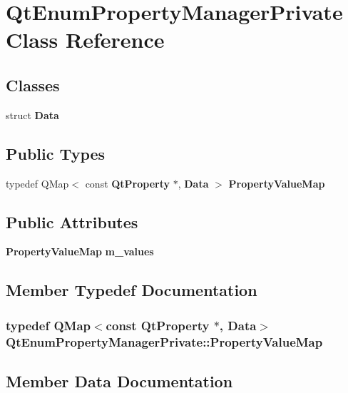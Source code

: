 \section{Qt\+Enum\+Property\+Manager\+Private Class Reference}
\label{classQtEnumPropertyManagerPrivate}
\subsection*{Classes}
\begin{DoxyCompactItemize}
\item 
struct {\bf Data}
\end{DoxyCompactItemize}
\subsection*{Public Types}
\begin{DoxyCompactItemize}
\item 
typedef Q\+Map$<$ const {\bf Qt\+Property} $\ast$, {\bf Data} $>$ {\bf Property\+Value\+Map}
\end{DoxyCompactItemize}
\subsection*{Public Attributes}
\begin{DoxyCompactItemize}
\item 
{\bf Property\+Value\+Map} {\bf m\+\_\+values}
\end{DoxyCompactItemize}


\subsection{Member Typedef Documentation}
\subsubsection[{Property\+Value\+Map}]{\setlength{\rightskip}{0pt plus 5cm}typedef Q\+Map$<$const {\bf Qt\+Property} $\ast$, {\bf Data}$>$ {\bf Qt\+Enum\+Property\+Manager\+Private\+::\+Property\+Value\+Map}}\label{classQtEnumPropertyManagerPrivate_a4033d518dcada97312b25a0097fe71d3}


\subsection{Member Data Documentation}
